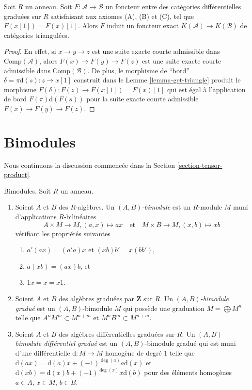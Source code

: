 \begin{lemma}
\label{lemma-functor-between-ABC}
Soit $R$ un anneau. Soit $F : \mathcal{A} \to \mathcal{B}$ un foncteur entre des
catégories différentielles graduées sur $R$ satisfaisant aux axiomes (A), (B) et
(C), tel que $F(x[1]) = F(x)[1]$. Alors $F$ induit un foncteur exact
$K(\mathcal{A}) \to K(\mathcal{B})$ de catégories triangulées.
\end{lemma}

\begin{proof}
En effet, si $x \to y \to z$ est une suite exacte courte admissible dans
$\text{Comp}(\mathcal{A})$, alors $F(x) \to F(y) \to F(z)$ est une suite exacte
courte admissible dans $\text{Comp}(\mathcal{B})$. De plus, le morphisme de
``bord'' $\delta = \pi\text{d}(s) : z \to x[1]$ construit dans le Lemme
\ref{lemma-get-triangle} produit le morphisme $F(\delta) : F(z) \to F(x[1]) =
F(x)[1]$ qui est égal à l'application de bord $F(\pi) \text{d}(F(s))$ pour la
suite exacte courte admissible $F(x) \to F(y) \to F(z)$.
\end{proof}





\section{Bimodules}
\label{section-bimodules}

\noindent
Nous continuons la discussion commencée dans la Section
\ref{section-tensor-product}.

\begin{definition}
\label{definition-bimodule}
Bimodules. Soit $R$ un anneau.
\begin{enumerate}
\item Soient $A$ et $B$ des $R$-algèbres. Un {\it $(A, B)$-bimodule} est un
$R$-module $M$ muni d'applications $R$-bilinéaires
$$
A \times M \to M, (a, x) \mapsto ax
\quad\text{et}\quad
M \times B \to M, (x, b) \mapsto xb
$$
vérifiant les propriétés suivantes
\begin{enumerate}
\item $a'(ax) = (a'a)x$ et $(xb)b' = x(bb')$,
\item $a(xb) = (ax)b$, et
\item $1 x = x = x 1$.
\end{enumerate}
\item Soient $A$ et $B$ des algèbres graduées par $\mathbf{Z}$ sur $R$. Un {\it
$(A, B)$-bimodule gradué} est un $(A, B)$-bimodule $M$ qui possède une graduation $M =
\bigoplus M^n$ telle que $A^n M^m \subset M^{n + m}$ et $M^n B^m \subset M^{n +
m}$.
\item Soient $A$ et $B$ des algèbres différentielles graduées sur $R$. Un {\it
$(A, B)$-bimodule différentiel gradué} est un $(A, B)$-bimodule gradué qui est
muni d'une différentielle $\text{d} : M \to M$ homogène de degré $1$ telle que
$\text{d}(ax) = \text{d}(a)x + (-1)^{\deg(a)}a\text{d}(x)$ et $\text{d}(xb) =
\text{d}(x)b + (-1)^{\deg(x)}x\text{d}(b)$ pour des éléments homogènes $a \in A$,
$x \in M$, $b \in B$.
\end{enumerate}
\end{definition}

